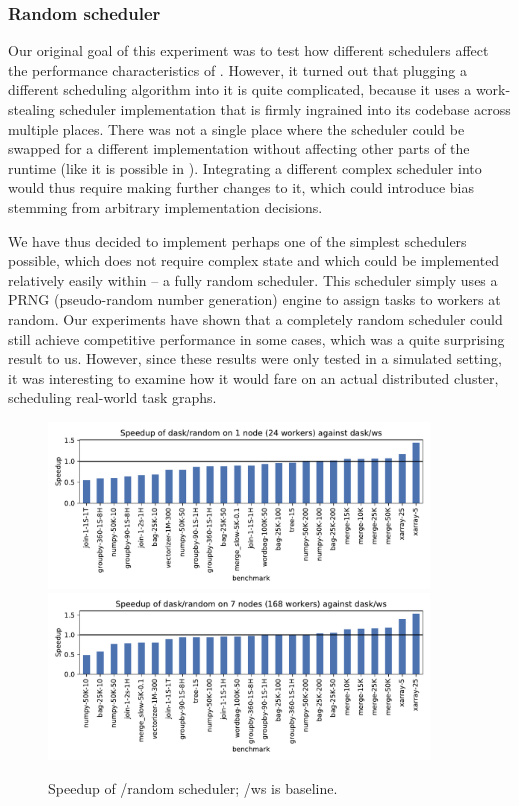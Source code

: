 \subsubsection*{Random scheduler}
Our original goal of this experiment was to test how different schedulers affect the performance
characteristics of \dask{}. However, it turned out that plugging a different
scheduling algorithm into it is quite complicated, because it uses a work-stealing scheduler
implementation that is firmly ingrained into its codebase across multiple places. There was not a
single place where the scheduler could be swapped for a different implementation without affecting
other parts of the runtime (like it is possible in \estee{}). Integrating a
different complex scheduler into \dask{} would thus require making further changes
to it, which could introduce bias stemming from arbitrary implementation decisions.

We have thus decided to implement perhaps one of the simplest schedulers possible, which does not
require complex state and which could be implemented relatively easily within
\dask{} -- a fully random scheduler. This scheduler simply uses a PRNG
(pseudo-random number generation) engine to assign tasks to workers at random. Our
\estee{} experiments have shown that a completely random scheduler could still
achieve competitive performance in some cases, which was a quite surprising result to us. However,
since these results were only tested in a simulated setting, it was interesting to examine how it
would fare on an actual distributed cluster, scheduling real-world \dask{} task
graphs.

\begin{figure}
	\centering
	\includegraphics[width=0.9\textwidth]{imgs/rsds/charts/speedup-dask-random-1}
	\includegraphics[width=0.9\textwidth]{imgs/rsds/charts/speedup-dask-random-7}
	\caption{Speedup of \dask{}/random scheduler; \dask{}/ws is baseline.}
	\label{fig:dask-ws-vs-random}
\end{figure}

